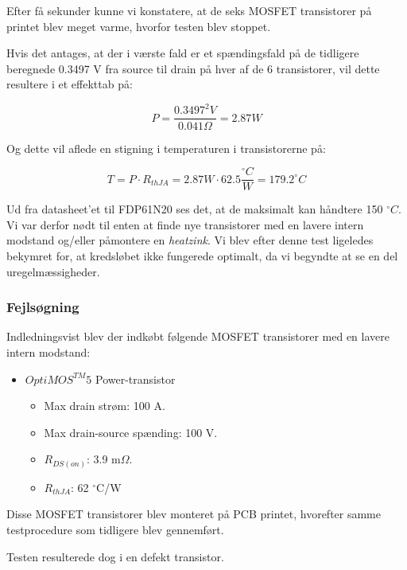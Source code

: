 Efter få sekunder kunne vi konstatere, at de seks MOSFET transistorer på printet blev meget varme, hvorfor testen blev stoppet.

Hvis det antages, at der i værste fald er et spændingsfald på de tidligere beregnede 0.3497 V fra source til drain på hver af de 6 transistorer, vil dette resultere i et effekttab på:

\begin{equation}
  \label{eq:2}
  P = \frac{0.3497^2V}{0.041 \Omega}=2.87 W
\end{equation}

Og dette vil aflede en stigning i temperaturen i transistorerne på:

\begin{equation}
  \label{eq:3}
  T=P\cdot R_{thJA} = 2.87 W \cdot 62.5 \frac{^\circ C}{W}=179.2 ^\circ C
\end{equation}

Ud fra datasheet’et til FDP61N20 ses det, at de maksimalt kan håndtere 150 $^\circ C$. Vi var derfor nødt til enten at finde nye transistorer med en lavere intern modstand og/eller påmontere en \textit{heatzink}. Vi blev efter denne test ligeledes bekymret for, at kredsløbet ikke fungerede optimalt, da vi begyndte at se en del uregelmæssigheder.

\subsubsection{Fejlsøgning}
\label{sec:fejlsogning}

Indledningsvist blev der indkøbt følgende MOSFET transistorer med en lavere intern modstand:

\begin{itemize}
\item $OptiMOS^{TM}5$ Power-transistor
  \begin{itemize}
  \item Max drain strøm: 100 A.
  \item Max drain-source spænding: 100 V.
  \item $R_{DS(on)}$: 3.9 m$\Omega$.
  \item $R_{thJA}$: 62 $^\circ$C/W
  \end{itemize}
\end{itemize}

Disse MOSFET transistorer blev monteret på PCB printet, hvorefter samme testprocedure som tidligere blev gennemført.  

Testen resulterede dog i en defekt transistor.

